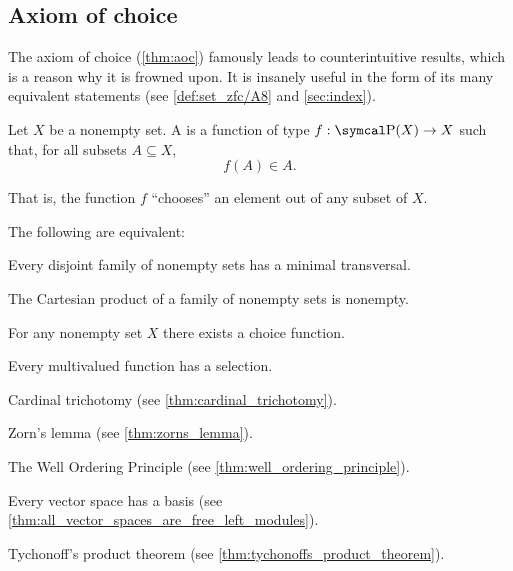\subsection{Axiom of choice}\label{subsec:axiom_of_choice}

\begin{remark}\label{remark:aoc}
  The axiom of choice (\cref{thm:aoc}) famously leads to counterintuitive results, which is a reason why it is frowned upon. It is insanely useful in the form of its many equivalent statements (see \cref{def:set_zfc/A8} and \cref{sec:index}).
\end{remark}

\begin{definition}\label{def:choice_function}
  Let \( X \) be a nonempty set. A  is a function of type \( f: \Power(X) \to X \) such that, for all subsets \( A \subseteq X \),
  \begin{equation*}
    f(A) \in A.
  \end{equation*}

  That is, the function \( f \) \enquote{chooses} an element out of any subset of \( X \).
\end{definition}

\begin{theorem}\label{thm:aoc}
  The following are equivalent:

  \begin{thmenum}
    \cite[theorem 6M(4)]{Enderton1977} Every disjoint family of nonempty sets has a minimal transversal.

    \cite[theorem 6M(2)]{Enderton1977} The Cartesian product of a family of nonempty sets is nonempty.

    \cite[theorem 6M(3)]{Enderton1977} For any nonempty set \( X \) there exists a choice function.

    \cite[theorem 6M(1)]{Enderton1977} Every multivalued function has a selection.

     Cardinal trichotomy (see \cref{thm:cardinal_trichotomy}).

     Zorn's lemma (see \cref{thm:zorns_lemma}).

     The Well Ordering Principle (see \cref{thm:well_ordering_principle}).

     Every vector space has a basis (see \cref{thm:all_vector_spaces_are_free_left_modules}).

     Tychonoff's product theorem (see \cref{thm:tychonoffs_product_theorem}).
  \end{thmenum}
\end{theorem}
